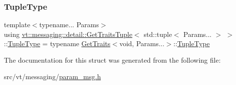 \subsubsection{\texorpdfstring{Tuple\+Type}{TupleType}}
{\footnotesize\ttfamily template$<$typename... Params$>$ \\
using \hyperlink{structvt_1_1messaging_1_1detail_1_1_get_traits_tuple}{vt\+::messaging\+::detail\+::\+Get\+Traits\+Tuple}$<$ std\+::tuple$<$ Params... $>$ $>$\+::\hyperlink{structvt_1_1messaging_1_1detail_1_1_get_traits_tuple_3_01std_1_1tuple_3_01_params_8_8_8_01_4_01_4_a54beecbf30cc403de7f176508983f04d}{Tuple\+Type} =  typename \hyperlink{structvt_1_1messaging_1_1detail_1_1_get_traits}{Get\+Traits}$<$void, Params...$>$\+::\hyperlink{structvt_1_1messaging_1_1detail_1_1_get_traits_tuple_3_01std_1_1tuple_3_01_params_8_8_8_01_4_01_4_a54beecbf30cc403de7f176508983f04d}{Tuple\+Type}}



The documentation for this struct was generated from the following file\+:\begin{DoxyCompactItemize}
\item 
src/vt/messaging/\hyperlink{param__msg_8h}{param\+\_\+msg.\+h}\end{DoxyCompactItemize}
